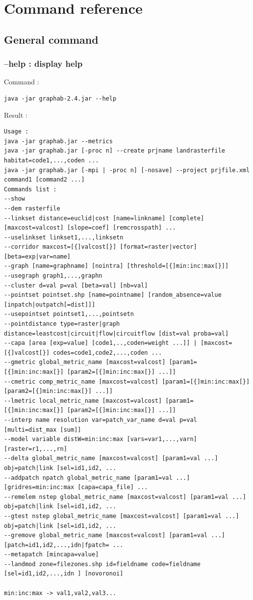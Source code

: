 \documentclass[a4paper,10pt]{report}
\begin{document}
\chapter{Command reference}
\section{General command}
\subsection{--help : display help}
Command :
\begin{Verbatim}
java -jar graphab-2.4.jar --help
\end{Verbatim}
Result :
\begin{verbatim}
Usage :
java -jar graphab.jar --metrics
java -jar graphab.jar [-proc n] --create prjname landrasterfile habitat=code1,...,coden ...
java -jar graphab.jar [-mpi | -proc n] [-nosave] --project prjfile.xml command1 [command2 ...]
Commands list :
--show
--dem rasterfile
--linkset distance=euclid|cost [name=linkname] [complete] [maxcost=valcost] [slope=coef] [remcrosspath] ...
--uselinkset linkset1,...,linksetn
--corridor maxcost=[{]valcost[}] [format=raster|vector] [beta=exp|var=name]
--graph [name=graphname] [nointra] [threshold=[{]min:inc:max[}]]
--usegraph graph1,...,graphn
--cluster d=val p=val [beta=val] [nb=val]
--pointset pointset.shp [name=pointname] [random_absence=value [inpatch|outpatch[=dist]]]
--usepointset pointset1,...,pointsetn
--pointdistance type=raster|graph distance=leastcost|circuit|flow|circuitflow [dist=val proba=val]
--capa [area [exp=value] [code1,..,coden=weight ...]] | [maxcost=[{]valcost[}] codes=code1,code2,...,coden ...
--gmetric global_metric_name [maxcost=valcost] [param1=[{]min:inc:max[}] [param2=[{]min:inc:max[}] ...]]
--cmetric comp_metric_name [maxcost=valcost] [param1=[{]min:inc:max[}] [param2=[{]min:inc:max[}] ...]]
--lmetric local_metric_name [maxcost=valcost] [param1=[{]min:inc:max[}] [param2=[{]min:inc:max[}] ...]]
--interp name resolution var=patch_var_name d=val p=val [multi=dist_max [sum]]
--model variable distW=min:inc:max [vars=var1,...,varn] [raster=r1,...,rn]
--delta global_metric_name [maxcost=valcost] [param1=val ...] obj=patch|link [sel=id1,id2, ...
--addpatch npatch global_metric_name [param1=val ...] [gridres=min:inc:max [capa=capa_file] ...
--remelem nstep global_metric_name [maxcost=valcost] [param1=val ...] obj=patch|link [sel=id1,id2, ...
--gtest nstep global_metric_name [maxcost=valcost] [param1=val ...] obj=patch|link [sel=id1,id2, ...
--gremove global_metric_name [maxcost=valcost] [param1=val ...] [patch=id1,id2,...,idn|fpatch= ...
--metapatch [mincapa=value]
--landmod zone=filezones.shp id=fieldname code=fieldname [sel=id1,id2,...,idn ] [novoronoi]

min:inc:max -> val1,val2,val3...
\end{verbatim}
\end{document}
